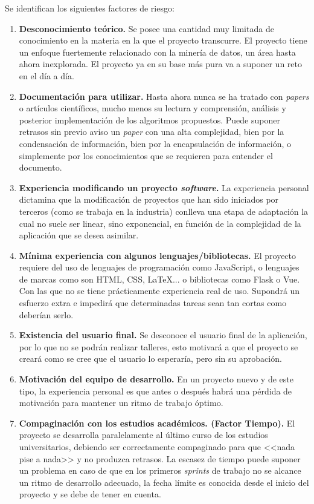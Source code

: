 Se identifican los siguientes factores de riesgo:
\begin{enumerate}
\item \textbf{Desconocimiento teórico.} Se posee una cantidad muy limitada de conocimiento en la materia en la que el proyecto transcurre. El proyecto tiene un enfoque fuertemente relacionado con la minería de datos, un área hasta ahora inexplorada. El proyecto ya en su base más pura va a suponer un reto en el día a día.
\item \textbf{Documentación para utilizar.} Hasta ahora nunca se ha tratado con \textit{papers} o artículos científicos, mucho menos su lectura y comprensión, análisis y posterior implementación de los algoritmos propuestos. Puede suponer retrasos sin previo aviso un \textit{paper} con una alta complejidad, bien por la condensación de información, bien por la encapsulación de información, o simplemente por los conocimientos que se  requieren para entender el documento.
\item \textbf{Experiencia modificando un proyecto \textit{software}.} La experiencia personal dictamina que la modificación de proyectos que han sido iniciados por terceros (como se trabaja en la industria) conlleva una etapa de adaptación la cual no suele ser linear, sino exponencial, en función de la complejidad de la aplicación que se desea asimilar.
\item \textbf{Mínima experiencia con algunos lenguajes/bibliotecas.} El proyecto requiere del uso de lenguajes de programación como JavaScript, o lenguajes de marcas como son HTML, CSS, \LaTeX ... o bibliotecas como Flask o Vue. Con las que no se tiene prácticamente experiencia real de uso. Supondrá un esfuerzo extra e impedirá que determinadas tareas sean tan cortas como deberían serlo.
\item \textbf{Existencia del usuario final.} Se desconoce el usuario final de la aplicación, por lo que no se podrán realizar talleres, esto motivará a que el proyecto se creará como se cree que el usuario lo esperaría, pero sin su aprobación.
\item \textbf{Motivación del equipo de desarrollo.} En un proyecto nuevo y de este tipo, la experiencia personal es que antes o después habrá una pérdida de motivación para mantener un ritmo de trabajo óptimo.
\item \textbf{Compaginación con los estudios académicos. (Factor Tiempo).} El proyecto se desarrolla paralelamente al último curso de los estudios universitarios, debiendo ser correctamente compaginado para que <<nada pise a nada>> y no produzca retrasos. La escasez de tiempo puede suponer un problema en caso de que en los primeros \textit{sprints} de trabajo no se alcance un ritmo de desarrollo adecuado, la fecha límite es conocida desde el inicio del proyecto y se debe de tener en cuenta.

\end{enumerate}
